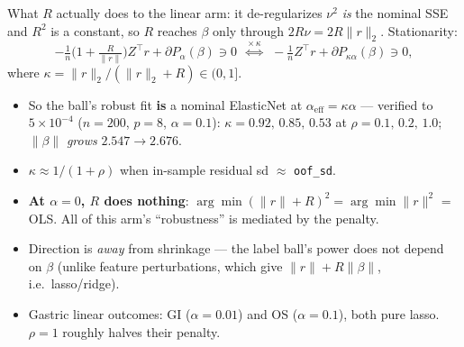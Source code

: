 \documentclass{beamer}
\begin{document}
\begin{frame}{What $R$ actually does to the linear arm: it de-regularizes}
  \small
  $\nu^2$ \emph{is} the nominal SSE and $R^2$ is a constant, so $R$ reaches $\beta$
  only through $2R\nu = 2R\lVert r\rVert_2$. Stationarity:
  \[
    -\tfrac{1}{n}\Big(1+\tfrac{R}{\lVert r\rVert}\Big)Z^\top r + \partial P_\alpha(\beta) \ni 0
    \;\;\overset{\times\,\kappa}{\Longleftrightarrow}\;\;
    -\tfrac{1}{n}Z^\top r + \partial P_{\kappa\alpha}(\beta) \ni 0 ,
  \]
  where $\kappa=\lVert r\rVert_2/(\lVert r\rVert_2+R)\in(0,1]$.
  \begin{itemize}
    \item So the ball's robust fit \textbf{is} a nominal ElasticNet at
      $\alpha_{\text{eff}}=\kappa\alpha$ --- verified to $5\times10^{-4}$
      ($n{=}200$, $p{=}8$, $\alpha{=}0.1$): $\kappa=0.92,\,0.85,\,0.53$ at
      $\rho=0.1,\,0.2,\,1.0$; $\lVert\beta\rVert$ \emph{grows} $2.547\to2.676$.
    \item $\kappa\approx 1/(1+\rho)$ when in-sample residual sd $\approx$ \texttt{oof\_sd}.
    \item \textbf{At $\alpha=0$, $R$ does nothing}: $\arg\min(\lVert r\rVert+R)^2=\arg\min\lVert r\rVert^2$
      = OLS. All of this arm's ``robustness'' is mediated by the penalty.
    \item Direction is \emph{away} from shrinkage --- the label ball's power does not
      depend on $\beta$ (unlike feature perturbations, which give
      $\lVert r\rVert+R\lVert\beta\rVert$, i.e.\ lasso/ridge).
    \item Gastric linear outcomes: GI ($\alpha{=}0.01$) and OS ($\alpha{=}0.1$), both
      pure lasso. $\rho{=}1$ roughly halves their penalty.
  \end{itemize}
\end{frame}
\end{document}
